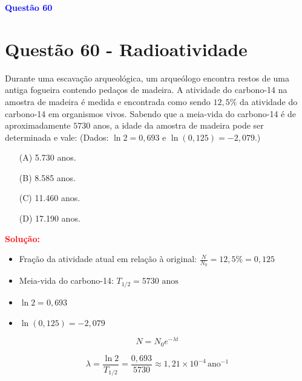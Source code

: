 \documentclass[a4paper,12pt]{article}
\begin{document}
\begin{flushleft}
\textbf{\textcolor{blue}{\Large Quest\~ao 60}}\\
\noindent
\section{Quest\~ao 60 - Radioatividade}
Durante uma escavação arqueológica, um arqueólogo encontra restos de uma antiga fogueira contendo pedaços de madeira.  
A atividade do carbono-14 na amostra de madeira é medida e encontrada como sendo \(12{,}5\%\) da atividade do carbono-14 em organismos vivos.  
Sabendo que a meia-vida do carbono-14 é de aproximadamente \(5730\) anos, a idade da amostra de madeira pode ser determinada e vale:  
(Dados: \(\ln 2 = 0{,}693\) e \(\ln(0{,}125) = -2{,}079\).)

\begin{itemize}
\item[(A)] 5.730 anos.
\item[(B)] 8.585 anos.
\item[(C)] 11.460 anos.
\item[(D)] 17.190 anos.
\end{itemize}

\vspace{0.5cm}

\textcolor{red}{\textbf{Solução:}}\\


\begin{itemize}
    \item Fração da atividade atual em relação à original: \(\frac{N}{N_0} = 12{,}5\% = 0{,}125\)
    \item Meia-vida do carbono-14: \(T_{1/2} = 5730 \text{ anos}\)
    \item \(\ln 2 = 0{,}693\)
    \item \(\ln(0{,}125) = -2{,}079\)
\end{itemize}

\vspace{0.3cm}


\[
N = N_0 e^{-\lambda t}
\]


\vspace{0.3cm}


\[
\lambda = \frac{\ln 2}{T_{1/2}} = \frac{0{,}693}{5730} \approx 1{,}21 \times 10^{-4}\, \text{ano}^{-1}
\]


\end{flushleft}
\end{document}
